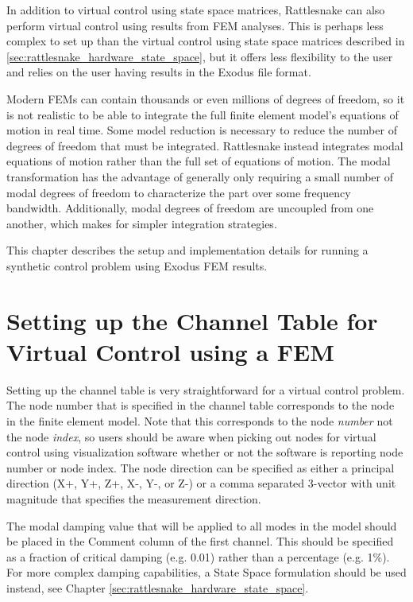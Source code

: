 \documentclass[pdf,12pt,report]{SANDreport}
\begin{document}
    In addition to virtual control using state space matrices, Rattlesnake can also perform virtual control using results from \ac{FEM} analyses.  This is perhaps less complex to set up than the virtual control using state space matrices described in \ref{sec:rattlesnake_hardware_state_space}, but it offers less flexibility to the user and relies on the user having results in the Exodus file format.
    
    Modern \ac{FEM}s can contain thousands or even millions of degrees of freedom, so it is not realistic to be able to integrate the full finite element model's equations of motion in real time.  Some model reduction is necessary to reduce the number of degrees of freedom that must be integrated.  Rattlesnake instead integrates modal equations of motion rather than the full set of equations of motion.  The modal transformation has the advantage of generally only requiring a small number of modal degrees of freedom to characterize the part over some frequency bandwidth.  Additionally, modal degrees of freedom are uncoupled from one another, which makes for simpler integration strategies.
    
    This chapter describes the setup and implementation details for running a synthetic control problem using Exodus \ac{FEM} results.
    
    \section{Setting up the Channel Table for Virtual Control using a \ac{FEM}}
    
    Setting up the channel table is very straightforward for a virtual control problem.  The node number that is specified in the channel table corresponds to the node in the finite element model.  Note that this corresponds to the node \textit{number} not the node \textit{index}, so users should be aware when picking out nodes for virtual control using visualization software whether or not the software is reporting node number or node index.  The node direction can be specified as either a principal direction (X+, Y+, Z+, X-, Y-, or Z-) or a comma separated 3-vector with unit magnitude that specifies the measurement direction.
    
    The modal damping value that will be applied to all modes in the model should be placed in the Comment column of the first channel.  This should be specified as a fraction of critical damping (e.g. 0.01) rather than a percentage (e.g. 1\%).  For more complex damping capabilities, a State Space formulation should be used instead, see Chapter \ref{sec:rattlesnake_hardware_state_space}.
    
\end{document}
